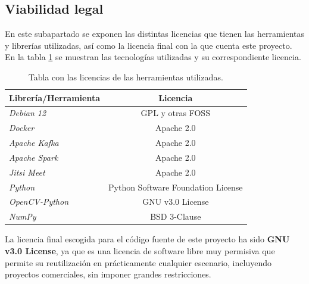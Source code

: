 \subsection{Viabilidad legal}
En este subapartado se exponen las distintas licencias que tienen las herramientas y librerías utilizadas, así como la licencia final con la que cuenta este proyecto. En la tabla \ref{tablaA5} se muestran las tecnologías utilizadas y su correspondiente licencia.

\begin{table}[H]
    \centering
    \begin{tabular}{lc}
        \hline
        \rowcolor[HTML]{EFEFEF} 
        \textbf{Librería/Herramienta} & \textbf{Licencia} \\ \hline
        \rowcolor[HTML]{ECF4FF} 
        \textit{Debian 12} & GPL y otras FOSS \\
        \rowcolor[HTML]{EFEFEF} 
        \textit{Docker} & Apache 2.0 \\
        \rowcolor[HTML]{ECF4FF} 
        \textit{Apache Kafka} & Apache 2.0 \\
        \rowcolor[HTML]{EFEFEF} 
        \textit{Apache Spark} & Apache 2.0 \\
        \rowcolor[HTML]{ECF4FF} 
        \textit{Jitsi Meet} & Apache 2.0 \\
        \rowcolor[HTML]{EFEFEF} 
        \textit{Python} & Python Software Foundation License \\
        \rowcolor[HTML]{ECF4FF} 
        \textit{OpenCV-Python} & GNU v3.0 License \\
        \rowcolor[HTML]{EFEFEF} 
        \textit{NumPy} & BSD 3-Clause \\
        \hline
    \end{tabular}
    \caption{Tabla con las licencias de las herramientas utilizadas.}
    \label{tablaA5}
\end{table}

La licencia final escogida para el código fuente de este proyecto ha sido \textbf{GNU v3.0 License}, ya que es una licencia de software libre muy permisiva que permite su reutilización en prácticamente cualquier escenario, incluyendo proyectos comerciales, sin imponer grandes restricciones.

